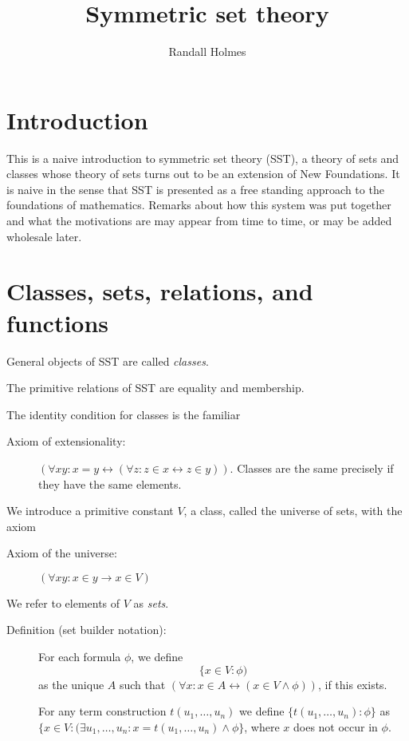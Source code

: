 \documentclass[12pt]{article}
\title{Symmetric set theory}
\author{Randall Holmes}
\begin{document}
\maketitle

\tableofcontents

\section{Introduction}

This is a naive introduction to symmetric set theory (SST), a theory of sets and classes whose theory of sets turns out to be an extension of New Foundations.
It is naive in the sense that SST is presented as a free standing approach to the foundations of mathematics.  Remarks about how this system was put together
and what the motivations are may appear from time to time, or may be added wholesale later.

\section{Classes, sets, relations, and functions}

General objects of SST are called {\em classes\/}.

The primitive relations of SST are equality and membership.

The identity condition for classes is the familiar

\begin{description}

\item[Axiom of extensionality:]  $(\forall xy:x=y \leftrightarrow (\forall z:z \in x \leftrightarrow z \in y))$.  Classes are the same precisely if they have the same elements.

\end{description}

We introduce a primitive constant $V$, a class, called the universe of sets, with the axiom

\begin{description}

\item[Axiom of the universe:]  $(\forall xy:x\in y \rightarrow x \in V)$

\end{description}

We refer to elements of $V$ as {\em sets\/}.

\begin{description}

\item[Definition (set builder notation):]  For each formula $\phi$, we define $$\{x \in V:\phi)$$ as the unique $A$ such that $(\forall x:x \in A \leftrightarrow (x \in V \wedge \phi))$, if this exists.

For any term construction $t(u_1,\ldots,u_n)$ we define $\{t(u_1,\ldots,u_n):\phi\}$ as $\{x \in V:(\exists u_1,\ldots,u_n:x=t(u_1,\ldots,u_n)\wedge \phi\}$, where $x$ does not occur in $\phi$.

\end{description}
\end{document}
